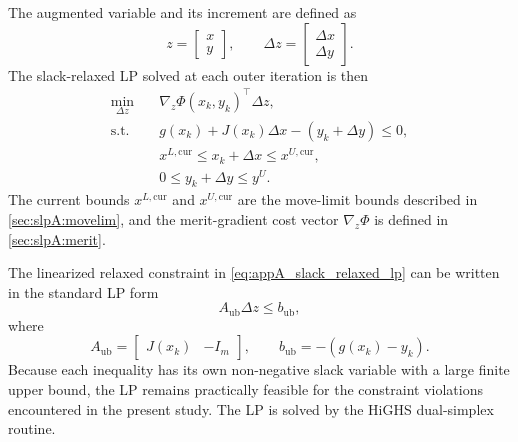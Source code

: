 The augmented variable and its increment are defined as
\begin{equation}
\label{eq:appA_augmented_variable}
    z =
    \begin{bmatrix}
        x \\ y
    \end{bmatrix},
    \qquad
    \Delta z =
    \begin{bmatrix}
        \Delta x \\ \Delta y
    \end{bmatrix}.
\end{equation}
The slack-relaxed LP solved at each outer iteration is then
\begin{equation}
\label{eq:appA_slack_relaxed_lp}
\begin{aligned}
    \min_{\Delta z}\quad
        & \nabla_z \Phi(x_k,y_k)^{\!\top}\Delta z ,
    \\
    \text{s.t.}\quad
        & g(x_k) + J(x_k)\Delta x - (y_k + \Delta y) \leq 0 ,
    \\
        & x^{L,\mathrm{cur}}
          \leq
          x_k + \Delta x
          \leq
          x^{U,\mathrm{cur}},
    \\
        & 0
          \leq
          y_k + \Delta y
          \leq
          y^U .
\end{aligned}
\end{equation}
The current bounds $x^{L,\mathrm{cur}}$ and $x^{U,\mathrm{cur}}$ are
the move-limit bounds described in \autoref{sec:slpA:movelim}, and
the merit-gradient cost vector $\nabla_z\Phi$ is defined in
\autoref{sec:slpA:merit}.

The linearized relaxed constraint in \autoref{eq:appA_slack_relaxed_lp}
can be written in the standard LP form
\begin{equation}
\label{eq:appA_lp_standard_form}
    A_{\mathrm{ub}}\Delta z \leq b_{\mathrm{ub}},
\end{equation}
where
\begin{equation}
\label{eq:appA_lp_standard_matrices}
    A_{\mathrm{ub}}
    =
    \begin{bmatrix}
        J(x_k) & -I_m
    \end{bmatrix},
    \qquad
    b_{\mathrm{ub}}
    =
    -\left(g(x_k)-y_k\right).
\end{equation}
Because each inequality has its own non-negative slack variable with
a large finite upper bound, the LP remains practically feasible for
the constraint violations encountered in the present study. The LP is
solved by the HiGHS dual-simplex routine.

